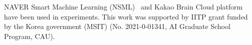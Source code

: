 \documentclass{article}
\begin{document}
\acksection
NAVER Smart Machine Learning (NSML)~\cite{nsml} and Kakao Brain Cloud platform have been used in experiments. This work was supported by IITP grant funded by the Korea government (MSIT) (No. 2021-0-01341, AI Graduate School Program, CAU).




% 


\newpage
\appendix



\end{document}
